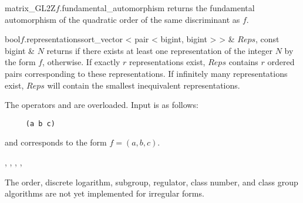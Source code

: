 \begin{fcode}{matrix_GL2Z}{$f$.fundamental_automorphism}{}
  returns the fundamental automorphism of the quadratic order of the same discriminant as $f$.
\end{fcode}




\begin{fcode}{bool}{$f$.representations}{sort_vector < pair < bigint, bigint > > & $\mathit{Reps}$,
    const bigint & $N$}%
  returns \TRUE if there exists at least one representation of the integer $N$ by the form $f$,
  \FALSE otherwise.  If exactly $r$ representations exist, $\mathit{Reps}$ contains $r$ ordered
  pairs corresponding to these representations.  If infinitely many representations exist,
  $\mathit{Reps}$ will contain the smallest inequivalent representations.
\end{fcode}



\IO

The operators \code{<<} and \code{>>} are overloaded.  Input is as follows:
\begin{verbatim}
     (a b c)
\end{verbatim}
and corresponds to the form $f = (a,b,c)$.



\SEEALSO

,
,
,
,



\NOTES

The order, discrete logarithm, subgroup, regulator, class number, and class group algorithms are
not yet implemented for irregular forms.



\EXAMPLES

